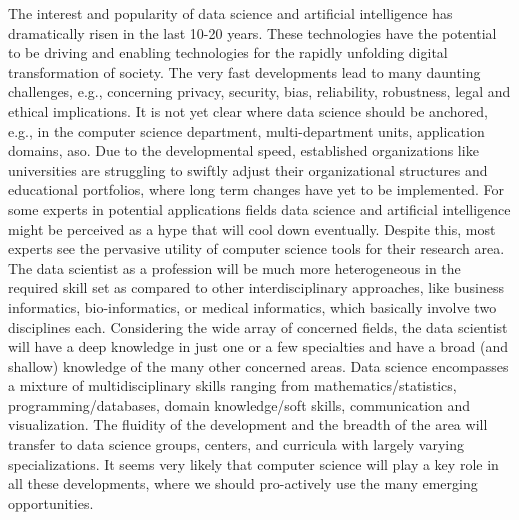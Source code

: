 The interest and popularity of data science and artificial intelligence has dramatically risen in the last 10-20 years. These technologies have the potential to be driving and enabling technologies for the rapidly unfolding digital transformation of society. The very fast developments lead to many daunting challenges, e.g., concerning privacy, security, bias, reliability, robustness, legal and ethical implications. It is not yet clear where data science should be anchored, e.g., in the computer science department, multi-department units, application domains, aso. Due to the developmental speed, established organizations like universities are struggling to swiftly adjust their organizational structures and educational portfolios, where long term changes have yet to be implemented. For some experts in potential applications fields data science and artificial intelligence might be perceived as a hype that will cool down eventually. Despite this, most experts see the pervasive utility of computer science tools for their research area. The data scientist as a profession will be much more heterogeneous in the required skill set as compared to other interdisciplinary approaches, like business informatics, bio-informatics, or medical informatics, which basically involve two disciplines each. Considering the wide array of concerned fields, the data scientist will have a deep knowledge in just one or a few specialties and have a broad (and shallow) knowledge of the many other concerned areas. Data science encompasses a mixture of multidisciplinary skills ranging from mathematics/statistics, programming/databases, domain knowledge/soft skills, communication and visualization. The fluidity of the development and the breadth of the area will transfer to data science groups, centers, and curricula with largely varying specializations. It seems very likely that computer science will play a key role in all these developments, where we should pro-actively use the many emerging opportunities.
